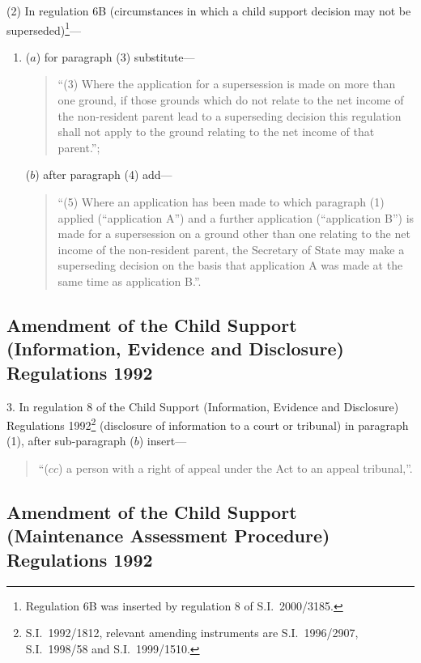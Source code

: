 \documentclass[12pt,a4paper]{article}
\begin{document}
(2) In regulation 6B (circumstances in which a child support decision may not be superseded)\footnote{Regulation 6B was inserted by regulation 8 of S.I.\ 2000/3185.}—
\begin{enumerate}\item[]
($a$) for paragraph (3) substitute—
\begin{quotation}
“(3) Where the application for a supersession is made on more than one ground, if those grounds which do not relate to the net income of the non-resident parent lead to a superseding decision this regulation shall not apply to the ground relating to the net income of that parent.”;
\end{quotation}

($b$) after paragraph (4) add—
\begin{quotation}
“(5) Where an application has been made to which paragraph (1) applied (“application A”) and a further application (“application B”) is made for a supersession on a ground other than one relating to the net income of the non-resident parent, the Secretary of State may make a superseding decision on the basis that application A was made at the same time as application B.”.
\end{quotation}
\end{enumerate}

\subsection[3. Amendment of the Child Support (Information, Evidence and Disclosure) Regulations 1992]{Amendment of the Child Support (Information, Evidence and Disclosure) Regulations 1992}

3.  In regulation 8 of the Child Support (Information, Evidence and Disclosure) Regulations 1992\footnote{S.I.\ 1992/1812, relevant amending instruments are S.I.\ 1996/2907, S.I.\ 1998/58 and S.I.\ 1999/1510.} (disclosure of information to a court or tribunal) in paragraph (1), after sub-paragraph ($b$)  insert—
\begin{quotation}
“($cc$) a person with a right of appeal under the Act to an appeal tribunal,”.
\end{quotation}

\enlargethispage{-\baselineskip}

\subsection[4. Amendment of the Child Support (Maintenance Assessment Procedure) Regulations 1992]{Amendment of the Child Support (Maintenance Assessment Procedure) Regulations 1992}
\end{document}
